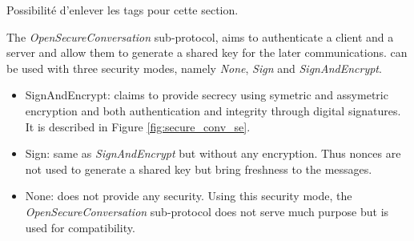 \newcommand{\gereq}{GEReq}
\newcommand{\geres}{GERes}
\newcommand{\oscreq}{OSCReq}
\newcommand{\oscres}{OSCRes}

\TODO Possibilité d'enlever les tags pour cette section.

The {\em OpenSecureConversation} sub-protocol, aims to authenticate a client and
a server and allow them to generate a shared key for the later communications.
\opcua can be used with three security modes, namely {\em None}, {\em Sign} and
{\em SignAndEncrypt}.

\begin{itemize}
    \item SignAndEncrypt: claims to provide secrecy using symetric and
    assymetric encryption and both authentication and integrity through digital
    signatures.
    It is described in Figure \ref{fig:secure_conv_se}.

    \item Sign: same as {\em SignAndEncrypt} but without any encryption.
    Thus nonces are not used to generate a shared key but bring freshness to the
    messages.

    \item None: does not provide any security.
    Using this security mode, the {\em OpenSecureConversation} sub-protocol does
    not serve much purpose but is used for compatibility.
\end{itemize}

